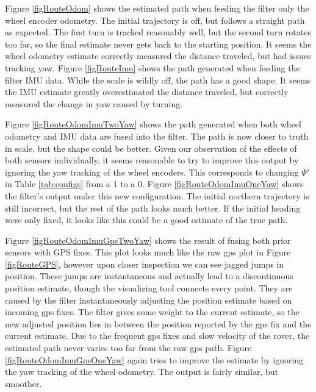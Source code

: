 Figure \ref{figRouteOdom} shows the estimated path when feeding the filter only the wheel encoder odometry. The initial trajectory is off, but follows a straight path as expected. The first turn is tracked reasonably well, but the second turn rotates too far, so the final estimate never gets back to the starting position. It seems the wheel odometry estimate correctly measured the distance traveled, but had issues tracking yaw. Figure \ref{figRouteImu} shows the path generated when feeding the filter IMU data. While the scale is wildly off, the path has a good shape. It seems the IMU estimate greatly overestimated the distance traveled, but correctly measured the change in yaw caused by turning.

Figure \ref{figRouteOdomImuTwoYaw} shows the path generated when both wheel odometry and IMU data are fused into the filter. The path is now closer to truth in scale, but the shape could be better. Given our observation of the effects of both sensors individually, it seems reasonable to try to improve this output by ignoring the yaw tracking of the wheel encoders. This corresponds to changing \(\Psi'\) in Table \ref{tab:configs} from a 1 to a 0. Figure \ref{figRouteOdomImuOneYaw} shows the filter's output under this new configuration. The initial northern trajectory is still incorrect, but the rest of the path looks much better. If the initial heading were only fixed, it looks like this could be a good estimate of the true path.


Figure \ref{figRouteOdomImuGpsTwoYaw} shows the result of fusing both prior sensors with GPS fixes. This plot looks much like the raw gps plot in Figure \ref{figRouteGPS}, however upon closer inspection we can see jagged jumps in position. These jumps are instantaneous and actually lead to a discontinuous position estimate, though the visualizing tool connects every point. They are caused by the filter instantaneously adjusting the position estimate based on incoming gps fixes. The filter gives some weight to the current estimate, so the new adjusted position lies in between the position reported by the gps fix and the current estimate. Due to the frequent gps fixes and slow velocity of the rover, the estimated path never varies too far from the raw gps path. Figure \ref{figRouteOdomImuGpsOneYaw} again tries to improve the estimate by ignoring the yaw tracking of the wheel odometry. The output is fairly similar, but smoother.

